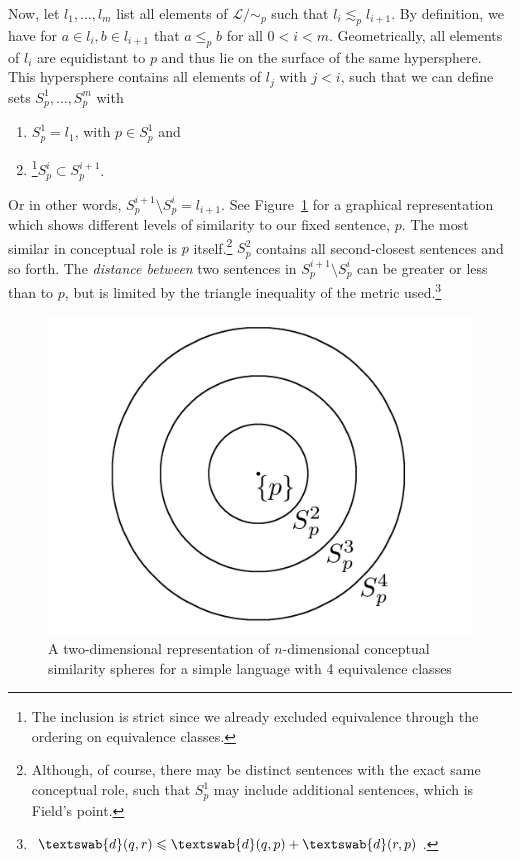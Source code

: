 \documentclass[11pt, a4paper]{scrartcl}
\renewcommand{\i}[1]{\emph{#1}}
\renewcommand{\L}{\mathcal{L}}
\newcommand{\m}[1]{\textswab{#1}}
\begin{document}
Now, let $l_1, \ldots, l_m$ list all elements of $\L/\!\sim_p$ such that $l_i \lesssim_p l_{i+1}$. By definition, we have for $a \in l_i, b \in l_{i+1}$ that $a \leqslant_p b$ for all $0 < i < m$. Geometrically, all elements of $l_i$ are equidistant to $p$ and thus lie on the surface of the same hypersphere. This hypersphere contains all elements of $l_j$ with $j < i$, such that we can define sets $S^1_p, \ldots, S^m_p$ with 
\begin{enumerate}[label = (\roman*)]
    \item $S^1_p = l_1$, with $p \in S^1_p$ and 
    \item\footnote{The inclusion is strict since we already excluded equivalence through the ordering on equivalence classes.}$S^i_p \subset S^{i+1}_p$. 
\end{enumerate}
Or in other words, $S^{i+1}_p \setminus S^{i}_p = l_{i+1}$. See Figure~\ref{fig:spheres} for a graphical representation which shows different levels of similarity to our fixed sentence, $p$. The most similar in conceptual role is $p$ itself.\footnote{Although, of course, there may be distinct sentences with the exact same conceptual role,  such that $S^1_p$ may include additional sentences, which is Field's point.} $S^2_p$ contains all second-closest sentences and so forth. The \i{distance between} two sentences in $S^{i+1}_p\setminus S^{i}_p$ can be greater or less than to $p$, but is limited by the triangle inequality of the metric used.\footnote{$\m{d}(q,r) \leqslant \m{d}(q,p) + \m{d}(r,p)$.} 

\begin{figure}
	\centering
    \includegraphics[width=\textwidth]{Similarityspheres.png}
    \caption{A two-dimensional representation of $n$-dimensional conceptual similarity spheres for a simple language with 4 equivalence classes\label{fig:spheres}}
\end{figure}
\end{document}
